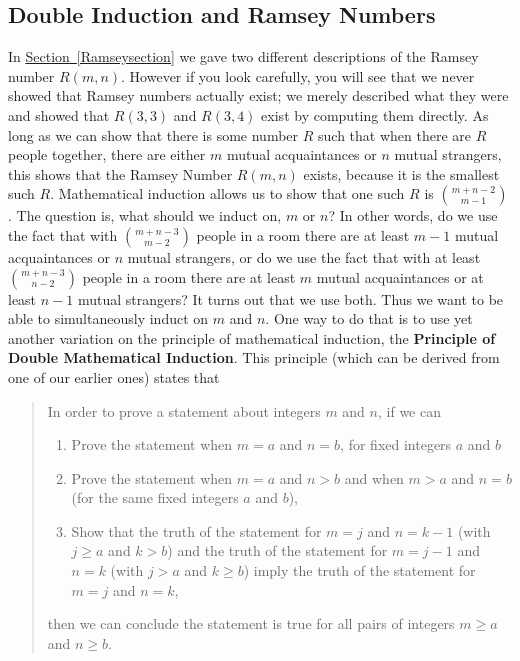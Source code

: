 \documentclass[10pt,]{book}
\newcommand{\terminology}[1]{\textbf{#1}}
\theoremstyle{plain}
\theoremstyle{definition}
\theoremstyle{definition}
\numberwithin{equation}{chapter}
\begin{document}
\subsection[{Double Induction and Ramsey Numbers}]{Double Induction and Ramsey Numbers}\label{subsection-15}
In \hyperref[Ramseysection]{Section~\ref{Ramseysection}} we gave two different descriptions of the Ramsey number \(R(m,n)\). However if you look carefully, you will see that we never showed that Ramsey numbers actually exist; we merely described what they were and showed that \(R(3,3)\) and \(R(3,4)\) exist by computing them directly. As long as we can show that there is some number \(R\) such that when there are \(R\) people together, there are either \(m\) mutual acquaintances or \(n\) mutual strangers, this shows that the Ramsey Number \(R(m,n)\) exists, because it is the smallest such \(R\). Mathematical induction allows us to show that one such \(R\) is \(\binom{m+n-2}{m-1}\). The question is, what should we induct on, \(m\) or \(n\)? In other words, do we use the fact that with \(\binom{m+n-3}{m-2}\) people in a room there are at least \(m-1\) mutual acquaintances or \(n\) mutual strangers, or do we use the fact that with at least \(\binom{m+n-3}{n-2}\) people in a room there are at least \(m\) mutual acquaintances or at least \(n-1\) mutual strangers? It turns out that we use both. Thus we want to be able to simultaneously induct on \(m\) and \(n\). One way to do that is to use yet another variation on the principle of mathematical induction, the \terminology{Principle of Double Mathematical Induction}. This principle (which can be derived from one of our earlier ones) states that%
\begin{quote}\hypertarget{blockquote-12}{}
In order to prove a statement about  integers \(m\) and \(n\), if we can \leavevmode%
\begin{enumerate}
\item\hypertarget{li-15}{}Prove the statement when \(m=a\) and \(n=b\), for  fixed integers \(a\) and \(b\)%
\item\hypertarget{li-16}{}Prove the statement when \(m=a\) and \(n>b\) and when \(m>a\)  and \(n=b\) (for the same fixed integers \(a\) and \(b\)),%
\item\hypertarget{li-17}{}Show that the truth of the statement for \(m=j\) and \(n=k-1\) (with \(j\ge a\) and \(k>b\)) and the truth of the statement for \(m=j-1\) and \(n=k\) (with \(j>a\) and \(k\ge b\)) imply the truth of the statement for \(m=j\) and \(n=k\),%
\end{enumerate}
 then we can conclude the statement is true for all pairs of integers \(m\ge
a\) and \(n\ge b\).%
\end{quote}
\end{document}
